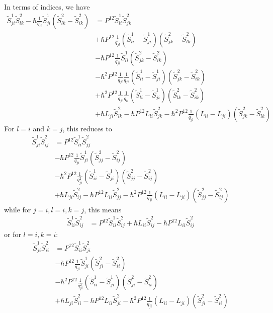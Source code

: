 \documentclass[11pt]{report}
\theoremstyle{definition}
\theoremstyle{remark}
\theoremstyle{remark}
\begin{document}
In terms of indices, we have
\begin{align*}
\tilde S_{ji}^1 \tilde S_{lk}^2 - \hbar \frac{1}{q_{li}} \tilde S_{ji}^1 (\tilde S_{lk}^2-\tilde S_{ik}^2)
&= P^{12} \tilde S_{li}^1 \tilde S_{jk}^2 \\
&+ \hbar P^{12} \frac{1}{q_{jl}} (\tilde S_{li}^1-\tilde S_{ji}^1) (\tilde S_{jk}^2-\tilde S_{lk}^2) \\
&-\hbar P^{12} \frac{1}{q_{ji}} \tilde S_{li}^1 (\tilde S_{jk}^2-\tilde S_{ik}^2) \\
&-\hbar^2 P^{12} \frac{1}{q_{jl}} \frac{1}{q_{ji}} (\tilde S_{li}^1-\tilde S_{ji}^1) (\tilde S_{jk}^2-\tilde S_{ik}^2) \\
&+\hbar^2 P^{12} \frac{1}{q_{jl}} \frac{1}{q_{li}} (\tilde S_{li}^1-\tilde S_{ji}^1) (\tilde S_{lk}^2-\tilde S_{ik}^2) \\
&+ \hbar L_{ji} \tilde S_{lk}^2 - \hbar P^{12} L_{li} \tilde S_{jk}^2 - \hbar^2 P^{12} \frac{1}{q_{jl}} (L_{li}-L_{ji}) (\tilde S_{jk}^2-\tilde S_{lk}^2)
\end{align*}
For $l=i$ and $k=j$, this reduces to
\begin{align*}
\tilde S_{ji}^1 \tilde S_{ij}^2
&= P^{12} \tilde S_{ii}^1 \tilde S_{jj}^2 \\
&- \hbar P^{12} \frac{1}{q_{ji}} \tilde S_{ji}^1 (\tilde S_{jj}^2-\tilde S_{ij}^2) \\
&-\hbar^2 P^{12} \frac{1}{q_{ji}^2} (\tilde S_{ii}^1-\tilde S_{ji}^1) (\tilde S_{jj}^2-\tilde S_{ij}^2) \\
&+ \hbar L_{ji} \tilde S_{ij}^2 - \hbar P^{12} L_{ii} \tilde S_{jj}^2 - \hbar^2 P^{12} \frac{1}{q_{ji}} (L_{ii}-L_{ji}) (\tilde S_{jj}^2-\tilde S_{ij}^2)
\end{align*}
while for $j=i,l=i,k=j$, this means
\begin{align*}
\tilde S_{ii}^1 \tilde S_{ij}^2
&= P^{12} \tilde S_{ii}^1 \tilde S_{ij}^2 + \hbar L_{ii} \tilde S_{ij}^2 - \hbar P^{12} L_{ii} \tilde S_{ij}^2
\end{align*}
or for $l=i,k=i$:
\begin{align*}
\tilde S_{ji}^1 \tilde S_{ii}^2
&= P^{12} \tilde S_{ii}^1 \tilde S_{ji}^2 \\
&- \hbar P^{12} \frac{1}{q_{ji}} \tilde S_{ji}^1 (\tilde S_{ji}^2-\tilde S_{ii}^2) \\
&-\hbar^2 P^{12} \frac{1}{q_{ji}^2} (\tilde S_{ii}^1-\tilde S_{ji}^1) (\tilde S_{ji}^2-\tilde S_{ii}^2) \\
&+ \hbar L_{ji} \tilde S_{ii}^2 - \hbar P^{12} L_{ii} \tilde S_{ji}^2 - \hbar^2 P^{12} \frac{1}{q_{ji}} (L_{ii}-L_{ji}) (\tilde S_{ji}^2-\tilde S_{ii}^2)
\end{align*}
\end{document}
